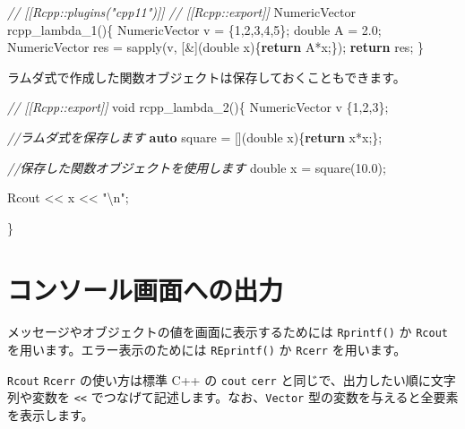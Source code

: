 \documentclass[]{book}
\newenvironment{Shaded}{\begin{snugshade}}{\end{snugshade}}
\newcommand{\CommentTok}[1]{\textcolor[rgb]{0.56,0.35,0.01}{\textit{#1}}}
\newcommand{\ControlFlowTok}[1]{\textcolor[rgb]{0.13,0.29,0.53}{\textbf{#1}}}
\newcommand{\DataTypeTok}[1]{\textcolor[rgb]{0.13,0.29,0.53}{#1}}
\newcommand{\DecValTok}[1]{\textcolor[rgb]{0.00,0.00,0.81}{#1}}
\newcommand{\FloatTok}[1]{\textcolor[rgb]{0.00,0.00,0.81}{#1}}
\newcommand{\KeywordTok}[1]{\textcolor[rgb]{0.13,0.29,0.53}{\textbf{#1}}}
\newcommand{\NormalTok}[1]{#1}
\newcommand{\SpecialCharTok}[1]{\textcolor[rgb]{0.00,0.00,0.00}{#1}}
\newcommand{\StringTok}[1]{\textcolor[rgb]{0.31,0.60,0.02}{#1}}
\begin{document}
\begin{Shaded}
\begin{Highlighting}[]
\CommentTok{// [[Rcpp::plugins("cpp11")]]}
\CommentTok{// [[Rcpp::export]]}
\NormalTok{NumericVector rcpp_lambda_1()\{}
\NormalTok{  NumericVector v = \{}\DecValTok{1}\NormalTok{,}\DecValTok{2}\NormalTok{,}\DecValTok{3}\NormalTok{,}\DecValTok{4}\NormalTok{,}\DecValTok{5}\NormalTok{\};}
  \DataTypeTok{double}\NormalTok{ A = }\FloatTok{2.0}\NormalTok{;}
\NormalTok{  NumericVector res =}
\NormalTok{    sapply(v, [&](}\DataTypeTok{double}\NormalTok{ x)\{}\ControlFlowTok{return}\NormalTok{ A*x;\});}
  \ControlFlowTok{return}\NormalTok{ res;}
\NormalTok{\}}
\end{Highlighting}
\end{Shaded}

ラムダ式で作成した関数オブジェクトは保存しておくこともできます。

\begin{Shaded}
\begin{Highlighting}[]
\CommentTok{// [[Rcpp::export]]}
\DataTypeTok{void}\NormalTok{ rcpp_lambda_2()\{}
\NormalTok{  NumericVector v  \{}\DecValTok{1}\NormalTok{,}\DecValTok{2}\NormalTok{,}\DecValTok{3}\NormalTok{\};}

  \CommentTok{//ラムダ式を保存します}
  \KeywordTok{auto}\NormalTok{ square = [](}\DataTypeTok{double}\NormalTok{ x)\{}\ControlFlowTok{return}\NormalTok{ x*x;\};}

  \CommentTok{//保存した関数オブジェクトを使用します}
  \DataTypeTok{double}\NormalTok{ x = square(}\FloatTok{10.0}\NormalTok{);}

\NormalTok{  Rcout << x << }\StringTok{"}\SpecialCharTok{\textbackslash{}n}\StringTok{"}\NormalTok{;}

\NormalTok{\}   }
\end{Highlighting}
\end{Shaded}

\chapter{コンソール画面への出力}

メッセージやオブジェクトの値を画面に表示するためには \texttt{Rprintf()} か \texttt{Rcout} を用います。エラー表示のためには \texttt{REprintf()} か \texttt{Rcerr} を用います。

\texttt{Rcout} \texttt{Rcerr} の使い方は標準 C++ の \texttt{cout} \texttt{cerr} と同じで、出力したい順に文字列や変数を \texttt{\textless{}\textless{}} でつなげて記述します。なお、\texttt{Vector} 型の変数を与えると全要素を表示します。
\end{document}
